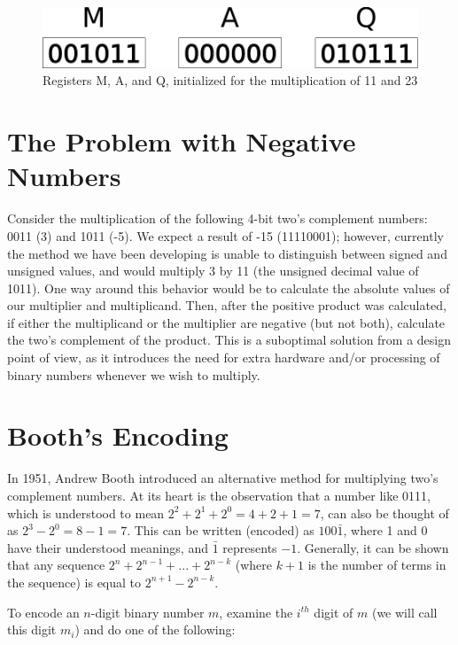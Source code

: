 \documentclass{article}
\begin{document}
\begin{figure}[h]
\centering
\includegraphics[scale=0.4]{init.pdf}
\caption{Registers M, A, and Q, initialized for the multiplication of 11 and 23}
\end{figure}%

\pagebreak

\section{The Problem with Negative Numbers}
Consider the multiplication of the following 4-bit two's complement numbers: 0011 (3) and 1011 (-5).
We expect a result of -15 (11110001); however, currently the method we have been developing is unable to distinguish between signed and unsigned values, and would multiply 3 by 11 (the unsigned decimal value of 1011).
One way around this behavior would be to calculate the absolute values of our multiplier and multiplicand.
Then, after the positive product was calculated, if either the multiplicand or the multiplier are negative (but not both), calculate the two's complement of the product.
This is a suboptimal solution from a design point of view, as it introduces the need for extra hardware and/or processing of binary numbers whenever we wish to multiply.

\section{Booth's Encoding}
In 1951, Andrew Booth introduced an alternative method for multiplying two's complement numbers.
At its heart is the observation that a number like 0111, which is understood to mean $2^2 + 2^1 + 2^0 = 4 + 2 + 1 = 7$, can also be thought of as $2^3 - 2^0 = 8 - 1 = 7$.
This can be written (encoded) as $100\bar{1}$, where 1 and 0 have their understood meanings, and $\bar{1}$ represents $-1$.
Generally, it can be shown that any sequence $2^n + 2^{n-1} + ... + 2^{n-k}$ (where $k+1$ is the number of terms in the sequence) is equal to $2^{n+1} - 2^{n-k}$.

To encode an $n$-digit binary number $m$, examine the $i^{th}$ digit of $m$ (we will call this digit $m_i$) and do one of the following: %
\end{document}
